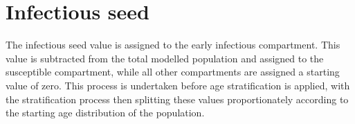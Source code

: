\section{Infectious seed}
The infectious seed value is assigned to the early infectious compartment.
This value is subtracted from the total modelled population and assigned to the susceptible compartment, while all other compartments are assigned a starting value of zero.
This process is undertaken before age stratification is applied,
with the stratification process then splitting these values proportionately according to the starting age distribution of the population.
